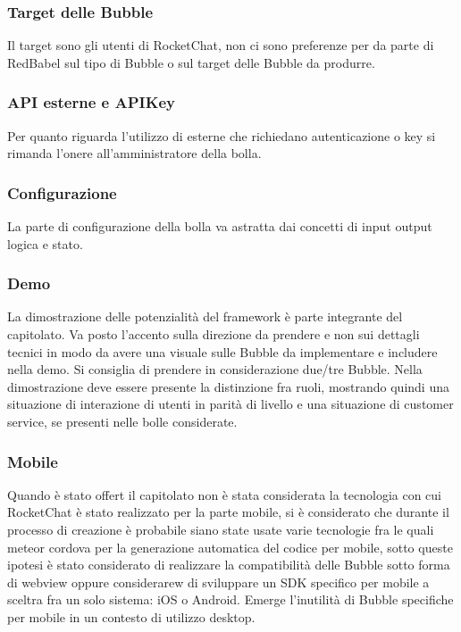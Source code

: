 \subsubsection{Target delle Bubble}
Il target sono gli utenti di RocketChat, non ci sono preferenze per da parte di RedBabel sul tipo di Bubble o sul target delle Bubble da produrre. 

\subsubsection{API esterne e APIKey}
Per quanto riguarda l’utilizzo di  esterne che richiedano autenticazione o key si rimanda l’onere all’amministratore della bolla.

\subsubsection{Configurazione}
La parte di configurazione della bolla va astratta dai concetti di input output logica e stato.

\subsubsection{Demo}
La dimostrazione delle potenzialità del framework è parte integrante del capitolato.
Va posto l’accento sulla direzione da prendere e non sui dettagli tecnici in modo da avere una visuale sulle Bubble da implementare e includere nella demo. Si consiglia di prendere in considerazione due/tre Bubble.
Nella dimostrazione deve essere presente la distinzione fra ruoli, mostrando quindi una situazione di interazione di utenti in parità di livello e una situazione di customer service, se presenti nelle bolle considerate. 

\subsubsection{Mobile}
Quando è stato offert il capitolato non è stata considerata la tecnologia con cui RocketChat è stato realizzato per la parte mobile, si è considerato che durante il processo di creazione è probabile siano state usate varie tecnologie fra le quali meteor cordova per la generazione automatica del codice per mobile, sotto queste ipotesi è stato considerato di realizzare la compatibilità delle Bubble sotto forma di webview oppure considerarew di sviluppare un SDK specifico per mobile a sceltra fra un solo sistema: iOS o Android.  
Emerge l’inutilità di Bubble specifiche per mobile in un contesto di utilizzo desktop.

\clearpage
